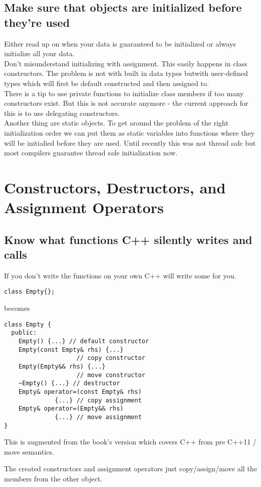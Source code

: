 \documentclass[a4paper, twocolumn]{article}
\let\oldsubsection\subsection
\newcounter{mysubsection}
\renewcommand{\subsection}{
    \stepcounter{mysubsection}
    \oldsubsection
}
\begin{document}
\subsection{Make sure that objects are initialized before they're used}
Either read up on when your data is guaranteed to be initialized or always initialize all your data.\\
Don't misunderstand initializing with assignment. This easily happens in class constructors. The problem is not with built in data types butwith user-defined types which will first be default constructed and then assigned to.\\
There is a tip to use private functions to initialize class members if too many constructors exist. But this is not accurate anymore - the current approach for this is to use delegating constructors.\\
Another thing are static objects. To get around the problem of the right initialization order we can put them as static variables into functions where they will be initialied before they are used. Until recently this was not thread safe but most compilers guarantee thread safe initialization now.
\newpage

\section{Constructors, Destructors, and Assignment Operators}

\subsection{Know what functions C++ silently writes and calls}
If you don't write the functions on your own C++ will write some for you.
\begin{verbatim}
class Empty{};
\end{verbatim}
becomes
\begin{verbatim}
class Empty {
  public:
    Empty() {...} // default constructor
    Empty(const Empty& rhs) {...}
                    // copy constructor
    Empty(Empty&& rhs) {...}
                    // move constructor
    ~Empty() {...} // destructor
    Empty& operator=(const Empty& rhs)
              {...} // copy assignment
    Empty& operator=(Empty&& rhs)
              {...} // move assignment
}
\end{verbatim}
This is augmented from the book's version which covers C++ from pre C++11 / move semantics.

The created constructors and assignment operators just copy/assign/move all the members from the other object.
\end{document}
